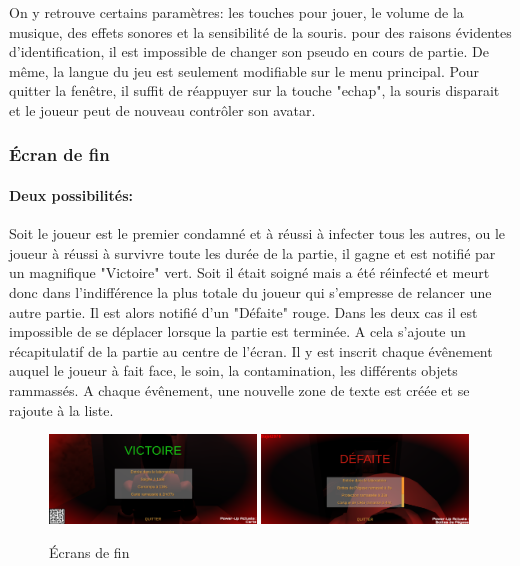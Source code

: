 \documentclass{article}
\begin{document}
On y retrouve certains paramètres: les touches pour jouer, le volume de la musique, des effets sonores et la sensibilité de la souris. pour des raisons évidentes d'identification, il est impossible de changer son pseudo en cours de partie. De même, la langue du jeu est seulement modifiable sur le menu principal. Pour quitter la fenêtre, il suffit de réappuyer sur la touche "echap", la souris disparait et le joueur peut de nouveau contrôler son avatar.

\subsubsection{Écran de fin}
\paragraph{Deux possibilités:}
Soit le joueur est le premier condamné et à réussi à infecter tous les autres, ou le joueur à réussi à survivre toute les durée de la partie, il gagne et est notifié par un magnifique "Victoire" vert. Soit il était soigné mais a été réinfecté et meurt donc dans l'indifférence la plus totale du joueur qui s'empresse de relancer une autre partie. Il est alors notifié d'un "Défaite" rouge. Dans les deux cas il est impossible de se déplacer lorsque la partie est terminée. A cela s'ajoute un récapitulatif de la partie au centre de l'écran. Il y est inscrit chaque évênement auquel le joueur à fait face, le soin, la contamination, les différents objets rammassés. A chaque évênement, une nouvelle zone de texte est créée et se rajoute à la liste.

\begin{figure}[H]
	\centering
	\includegraphics[width=0.49\textwidth]{Victoire.png}
	\includegraphics[width=0.49\textwidth]{Defaite.png}
	\caption{Écrans de fin}
	\label{Écrans de fin}
\end{figure}
\end{document}
